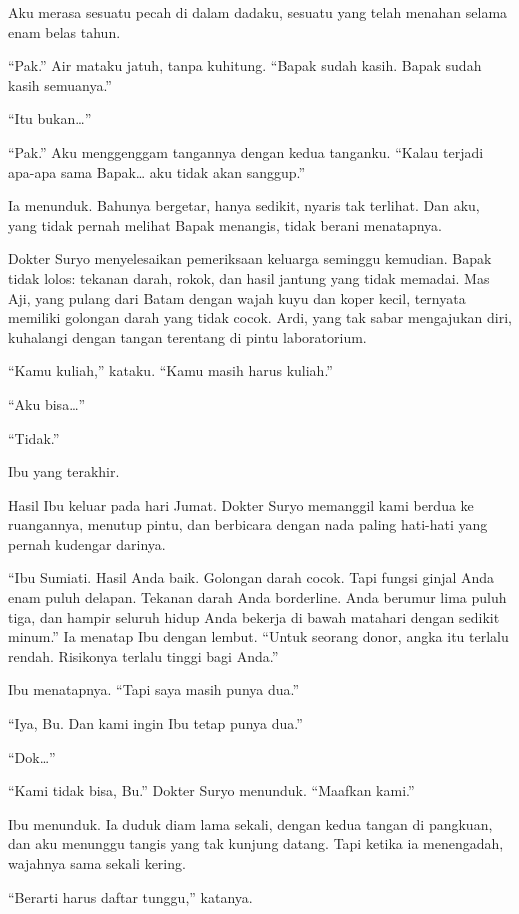 \documentclass[11pt,twoside,openany]{book}
\begin{document}
Aku merasa sesuatu pecah di dalam dadaku, sesuatu yang telah menahan selama enam belas tahun.

``Pak.'' Air mataku jatuh, tanpa kuhitung. ``Bapak sudah kasih. Bapak sudah kasih semuanya.''

``Itu bukan\ldots{}''

``Pak.'' Aku menggenggam tangannya dengan kedua tanganku. ``Kalau terjadi apa-apa sama Bapak\ldots{} aku tidak akan sanggup.''

Ia menunduk. Bahunya bergetar, hanya sedikit, nyaris tak terlihat. Dan aku, yang tidak pernah melihat Bapak menangis, tidak berani menatapnya.

Dokter Suryo menyelesaikan pemeriksaan keluarga seminggu kemudian. Bapak tidak lolos: tekanan darah, rokok, dan hasil jantung yang tidak memadai. Mas Aji, yang pulang dari Batam dengan wajah kuyu dan koper kecil, ternyata memiliki golongan darah yang tidak cocok. Ardi, yang tak sabar mengajukan diri, kuhalangi dengan tangan terentang di pintu laboratorium.

``Kamu kuliah,'' kataku. ``Kamu masih harus kuliah.''

``Aku bisa\ldots{}''

``Tidak.''

Ibu yang terakhir.

Hasil Ibu keluar pada hari Jumat. Dokter Suryo memanggil kami berdua ke ruangannya, menutup pintu, dan berbicara dengan nada paling hati-hati yang pernah kudengar darinya.

``Ibu Sumiati. Hasil Anda baik. Golongan darah cocok. Tapi fungsi ginjal Anda enam puluh delapan. Tekanan darah Anda borderline. Anda berumur lima puluh tiga, dan hampir seluruh hidup Anda bekerja di bawah matahari dengan sedikit minum.'' Ia menatap Ibu dengan lembut. ``Untuk seorang donor, angka itu terlalu rendah. Risikonya terlalu tinggi bagi Anda.''

Ibu menatapnya. ``Tapi saya masih punya dua.''

``Iya, Bu. Dan kami ingin Ibu tetap punya dua.''

``Dok\ldots{}''

``Kami tidak bisa, Bu.'' Dokter Suryo menunduk. ``Maafkan kami.''

Ibu menunduk. Ia duduk diam lama sekali, dengan kedua tangan di pangkuan, dan aku menunggu tangis yang tak kunjung datang. Tapi ketika ia menengadah, wajahnya sama sekali kering.

``Berarti harus daftar tunggu,'' katanya.
\end{document}
